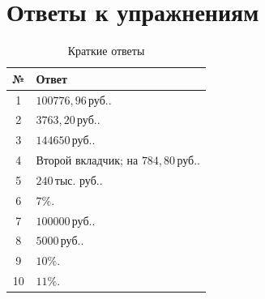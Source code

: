 \documentclass[a4paper,12pt]{article}
\newcommand{\rub}{\,\text{руб.}}
\newcommand{\thrub}{\,\text{тыс. руб.}}
\begin{document}
\newpage

\section*{Ответы к упражнениям}

\begin{table}[ht]
  \centering
  \caption{Краткие ответы}
  \renewcommand{\arraystretch}{1.4}
  \begin{tabularx}{\linewidth}{@{}cX@{}}
    \toprule
    № & Ответ \\
    \midrule
    1 & \(100776{,}96\rub\). \\
    2 & \(3763{,}20\rub\). \\
    3 & \(144650\rub\). \\
    4 & Второй вкладчик; на \(784{,}80\rub\). \\
    5 & \(240\thrub\). \\
    6 & \(7\%\). \\
    7 & \(100000\rub\). \\
    8 & \(5000\rub\). \\
    9 & \(10\%\). \\
    10 & \(11\%\). \\
    \bottomrule
  \end{tabularx}
\end{table}
\end{document}
